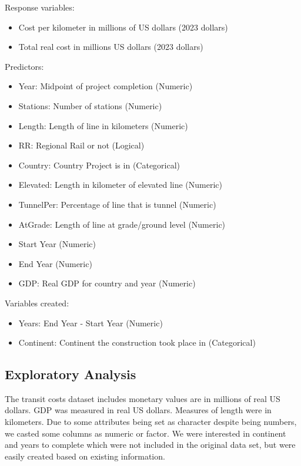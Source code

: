 \documentclass[12pt]{article}
\begin{document}
Response variables:
\begin{itemize}
    \itemsep-0.5em 
    \item Cost per kilometer in millions of US dollars (2023 dollars)
    \item Total real cost in millions US dollars (2023 dollars)
\end{itemize}
Predictors:
\begin{itemize}
    \itemsep-0.5em 
    \item Year: Midpoint of project completion (Numeric)
    \item Stations: Number of stations (Numeric)
    \item Length: Length of line in kilometers (Numeric)
    \item RR: Regional Rail or not (Logical)
    \item Country: Country Project is in (Categorical)
    \item Elevated: Length in kilometer of elevated line (Numeric)
    \item TunnelPer: Percentage of line that is tunnel (Numeric)
    \item AtGrade: Length of line at grade/ground level (Numeric)
    \item Start Year (Numeric)
    \item End Year (Numeric)
    \item GDP: Real GDP for country and year (Numeric)
\end{itemize}
Variables created:
\begin{itemize}
    \itemsep-0.5em 
    \item Years: End Year - Start Year (Numeric)
    \item Continent: Continent the construction took place in (Categorical)
\end{itemize}

\subsection{Exploratory Analysis}

The transit costs dataset includes monetary values are in millions of real US dollars. GDP was measured in real US dollars. Measures of length were in kilometers. Due to some attributes being set as character despite being numbers, we casted some columns as numeric or factor. We were interested in continent and years to complete which were not included in the original data set, but were easily created based on existing information. 
\end{document}
